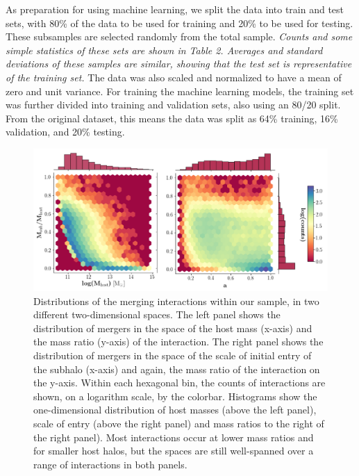 \documentclass[fleqn,usenatbib]{mnras}
\begin{document}
\par
    As preparation for using machine learning, we split the data into train and test sets, with 80\% of the data to be used for training and 20\% to be used for testing. These subsamples are selected randomly from the total sample. \textit{Counts and some simple statistics of these sets are shown in Table 2. Averages and standard deviations of these samples are similar, showing that the test set is representative of the training set.} The data was also scaled and normalized to have a mean of zero and unit variance. For training the machine learning models, the training set was further divided into training and validation sets, also using an 80/20 split. From the original dataset, this means the data was split as 64\% training, 16\% validation, and 20\% testing.


\begin{figure}
	\includegraphics[width=\textwidth]{Figures/combined_distributions_logBin}
    \caption{Distributions of the merging interactions within our sample, in two different two-dimensional spaces. The left panel shows the distribution of mergers in the space of the host mass (x-axis) and the mass ratio (y-axis) of the interaction. The right panel shows the distribution of mergers in the space of the scale of initial entry of the subhalo (x-axis) and again, the mass ratio of the interaction on the y-axis. Within each hexagonal bin, the counts of interactions are shown, on a logarithm scale, by the colorbar. Histograms show the one-dimensional distribution of host masses (above the left panel), scale of entry (above the right panel) and mass ratios to the right of the right panel). Most interactions occur at lower mass ratios and for smaller host halos, but the spaces are still well-spanned over a range of interactions in both panels. }
    \label{fig:combined_distributions_logBin}
\end{figure}
\end{document}
